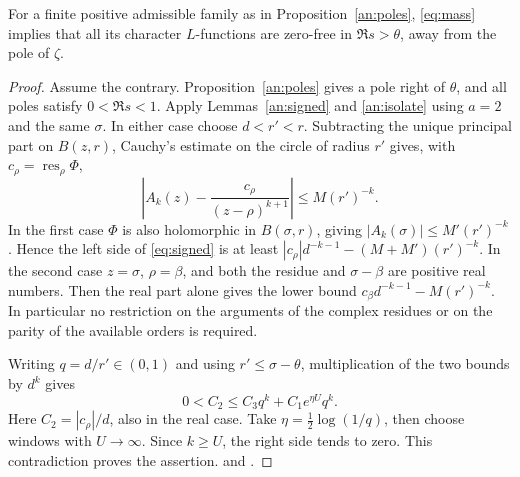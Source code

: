 \begin{theorem}\label{an:zero}
For a finite positive admissible family as in Proposition~\ref{an:poles}, \eqref{eq:mass} implies that all its character \(L\)-functions are zero-free in \(\Re s>\theta\), away from the pole of \(\zeta\).
\end{theorem}
\begin{proof}
Assume the contrary. Proposition~\ref{an:poles} gives a pole right of \(\theta\), and all poles satisfy \(0<\Re s<1\). Apply Lemmas~\ref{an:signed} and \ref{an:isolate} using \(a=2\) and the same \(\sigma\). In either case choose \(d<r'<r\). Subtracting the unique principal part on \(B(z,r)\), Cauchy's estimate on the circle of radius \(r'\) gives, with \(c_\rho=\operatorname{res}_{\rho}\Phi\),
\[
 \left|A_k(z)-\frac{c_\rho}{(z-\rho)^{k+1}}\right|
 \le M(r')^{-k}.
\]
In the first case \(\Phi\) is also holomorphic in \(B(\sigma,r)\), giving \(|A_k(\sigma)|\le M'(r')^{-k}\). Hence the left side of \eqref{eq:signed} is at least \(|c_\rho|d^{-k-1}-(M+M')(r')^{-k}\). In the second case \(z=\sigma\), \(\rho=\beta\), and both the residue and \(\sigma-\beta\) are positive real numbers. Then the real part alone gives the lower bound \(c_\beta d^{-k-1}-M(r')^{-k}\). In particular no restriction on the arguments of the complex residues or on the parity of the available orders is required.

Writing \(q=d/r'\in(0,1)\) and using \(r'\le \sigma-\theta\), multiplication of the two bounds by \(d^k\) gives
\[
 0<C_2\le C_3q^k+C_1e^{\eta U}q^k.
\]
Here \(C_2=|c_\rho|/d\), also in the real case. Take \(\eta=\tfrac12\log(1/q)\), then choose windows with \(U\to\infty\). Since \(k\ge U\), the right side tends to zero. This contradiction proves the assertion.  and .
\end{proof}
